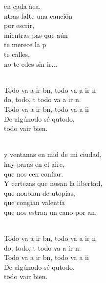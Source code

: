 \documentclass[12pt]{article}
\begin{document}
\begin{multicols*}{2}
\begin{cancion}
	en cada aea,\\
	ntras falte una canción\\
	por escrir,\\
	mientras pas que aún\\
	te merece la p\\
	 te calles, \\
	no te edes sin ir...\\\jump\\
	\begin{chorus}%
	Todo va a ir bn, todo va a ir n\\
	do, todo, t todo va a ir n.\\
	Todo va a ir bn, todo va a ii\\
	De algúnodo sé qutodo,\\
	todo vair bien.\\
	\end{chorus}%
	\jump\\
	y ventanas en mid de mi ciudad,\\
	hay paras en el aire,\\
	que nos cen confiar.\\
	Y certezas que nosan la libertad,\\
	que noablan de utopías,\\
	que congian valentía\\
	que nos estran un cano por an.\\\jump\\
	\begin{chorus}%
	Todo va a ir bn, todo va a ir n\\
	do, todo, t todo va a ir n.\\
	Todo va a ir bn, todo va a ii\\
	De algúnodo sé qutodo,\\
	todo vair bien.\\
	\end{chorus}%
	\jump\\
\end{cancion}%


\end{multicols*}
\end{document}
